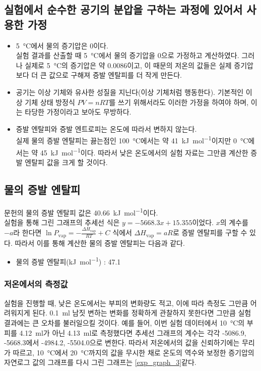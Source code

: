 \documentclass[a4paper,10pt]{article}
\begin{document}
	\subsection{실험에서 순수한 공기의 분압을 구하는 과정에 있어서 사용한 가정}
	\begin{itemize}
		\item \SI{5}{\degreeCelsius}에서 물의 증기압은 0이다. \\
		실험 결과를 산출할 때 \SI{5}{\degreeCelsius}에서 물의 증기압을 0으로 가정하고 계산하였다. 그러나 실제로 \SI{5}{\degreeCelsius}의 증기압은 약 \SI{0.0086}{\atmosphere}이고, 이 때문의 저온의 값들은 실제 증기압보다 더 큰 값으로 구해져 증발 엔탈피를 더 작게 만든다.
		\item 공기는 이상 기체와 유사한 성질을 지닌다(이상 기체처럼 행동한다).
		기본적인 이상 기체 상태 방정식 $PV=nRT$를 쓰기 위해서라도 이러한 가정을 하여야 하며, 이는 타당한 가정이라고 보아도 무방하다.
		\item 증발 엔탈피와 증발 엔트로피는 온도에 따라서 변하지 않는다. \\
		실제 물의 증발 엔탈피는 끓는점인 \SI{100}{\degreeCelsius}에서는 약 \SI{41}{\kilo\joule\per\mole}이지만 \SI{0}{\degreeCelsius}에서는 약 \SI{45}{\kilo\joule\per\mole}이다.\cite{vapor_1} 따라서 낮은 온도에서의 실험 자료는 그만큼 계산한 증발 엔탈피 값을 크게 할 것이다.
		
	\end{itemize}
	
	\subsection{물의 증발 엔탈피}
	문헌의 물의 증발 엔탈피 값은 \SI{40.66}{\kilo\joule\per\mole}이다. \cite{vapor_1} \\
	실험을 통해 그린 그래프의 추세선 식은 $y = -5668.3x + 15.355$이었다. $x$의 계수를 $-a$라 한다면 $\ln P_{\mathrm{vap}} = -\frac{\Delta H_{\mathrm{vap}}}{RT} + C$ 식에서 $\Delta H_{\mathrm{vap}} = aR$로 증발 엔탈피를 구할 수 있다. 따라서 이를 통해 계산한 물의 증발 엔탈피는 다음과 같다.
	\begin{itemize}
		\item 물의 증발 엔탈피(\si{\kilo\joule\per\mole}) : 47.1
	\end{itemize}
	
	\subsubsection{저온에서의 측정값}
	실험을 진행할 때, 낮은 온도에서는 부피의 변화량도 적고, 이에 따라 측정도 그만큼 어려워지게 된다. \SI{0.1}{\milli\litre} 남짓 변하는 변화를 정확하게 관찰하지 못한다면 그만큼 실험 결과에는 큰 오차를 불러일으킬 것이다. 예를 들어, 이번 실험 데이터에서 \SI{10}{\degreeCelsius}의 부피를 \SI{4.12}{\milli\litre}가 아닌 \SI{4.13}{\milli\litre}로 측정했다면 추세선 그래프의 계수는 각각 -5086.9, -5668.3에서 -4984.2, -5504.0으로 변한다. 따라서 저온에서의 값을 신뢰하기에는 무리가 따르고, \SI{10}{\degreeCelsius}에서 \SI{20}{\degreeCelsius}까지의 값을 무시한 채로 온도의 역수와 보정한 증기압의 자연로그 값의 그래프를 다시 그린 그래프는 \ref{exp_graph_3}\와 같다.
	
\end{document}
